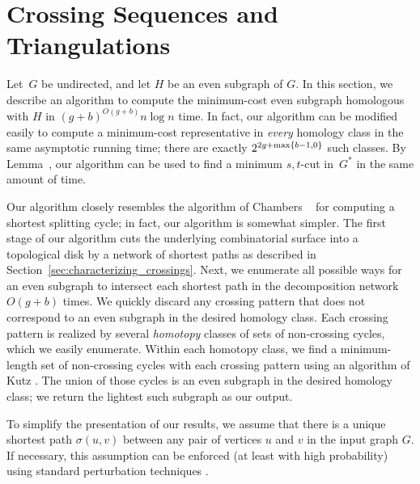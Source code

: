 \section{Crossing Sequences and Triangulations}
\label{sec:crossing}


Let~$G$ be undirected, and let $H$
be an even subgraph of $G$.  In this section, we describe an
algorithm to compute the minimum-cost even subgraph homologous with
$H$ in $(g+b)^{O(g+b)}n\log n$ time.  In fact, our algorithm can be
modified easily to compute a minimum-cost representative in
\emph{every} homology class in the same asymptotic running time;
there are exactly $2^{2g+\max\{ b-1,0 \}}$ such classes.
By Lemma~\cite{lem:surface-st-cut}, our algorithm can be used to find a minimum $s,t$-cut in~$G^*$ in the same amount of time.

Our algorithm closely resembles the algorithm of Chambers \etal~\cite{ccelw-scsih-08} for computing a shortest splitting cycle; in fact, our algorithm is somewhat simpler.  The first stage of our algorithm cuts the underlying combinatorial surface into a topological disk by a network of shortest paths as described in Section~\ref{sec:characterizing_crossings}.  Next, we enumerate all possible ways for an even subgraph to intersect each shortest path in the decomposition network $O(g+b)$ times.  We quickly discard any crossing pattern that does not correspond to an even subgraph in the desired homology class.  Each crossing pattern is realized by several \emph{homotopy} classes of sets of non-crossing cycles, which we easily enumerate.  Within each homotopy class, we find a minimum-length set of non-crossing cycles with each crossing pattern using an algorithm of Kutz \cite{k-csnco-06}.  The union of those cycles is an even subgraph in the desired homology class; we return the lightest such subgraph as our output.

To simplify the presentation of our results, we assume that there is a unique shortest path $\sigma(u,v)$ between any pair of vertices $u$ and $v$ in the input graph $G$.  If necessary, this assumption can be enforced (at least with high probability) using standard perturbation techniques \cite{mvv-memi-87}.